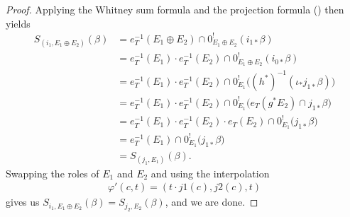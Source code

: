 \documentclass[12pt,dvipsnames]{amsart}
\begin{document}
\begin{proof}
  Applying the Whitney sum formula and the projection formula (\cite[\S 3.6]{kresch_CycleGroupsArtin1999}) then yields
  \begin{align*}
    S_{(i_1, E_1\oplus E_2)}(\beta) &= e^{-1}_T(E_1\oplus E_2) \cap 0^!_{E_1\oplus E_2}(i_{1*}\beta) \\
    &= e^{-1}_T(E_1)\cdot e_T^{-1}(E_2) \cap 0^!_{E_1\oplus E_2}(i_{0*}\beta) \\
    &= e^{-1}_T(E_1)\cdot e_T^{-1}(E_2) \cap 0^!_{E_1}\big((h^*)^{-1}(\iota_*j_{1*}\beta)\big) \\
    &= e^{-1}_T(E_1)\cdot e_T^{-1}(E_2) \cap 0^!_{E_1}\big(e_T(g^*E_2) \cap j_{1*}\beta\big) \\
    &= e^{-1}_T(E_1)\cdot e_T^{-1}(E_2)\cdot e_T(E_2) \cap 0^!_{E_1}\big(j_{1*}\beta\big) \\
    &= e_T^{-1}(E_1) \cap 0^!_{E_1}\big(j_{1*}\beta \big) \\
    &= S_{(j_1, E_1)}(\beta).
  \end{align*}
  Swapping the roles of \(E_1\) and \(E_2\) and using the interpolation
  \begin{align*}
    \varphi'(c,t) = (t·j1(c), j2(c), t)
  \end{align*}
  gives us \(S_{i_1, E_1\oplus E_2}(\beta) = S_{j_2, E_2}(\beta)\), and we are done.
\end{proof}
\end{document}
